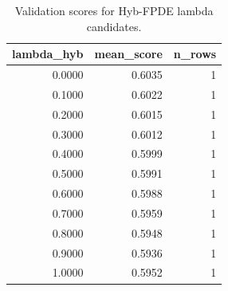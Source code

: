 \begin{table}[t]
\caption{Validation scores for Hyb-FPDE lambda candidates.}
\label{tab:lambda_distribution_computed}
\centering
\begin{tabular}{rrr}
\toprule
lambda\_hyb & mean\_score & n\_rows \\
\midrule
0.0000 & 0.6035 & 1 \\
0.1000 & 0.6022 & 1 \\
0.2000 & 0.6015 & 1 \\
0.3000 & 0.6012 & 1 \\
0.4000 & 0.5999 & 1 \\
0.5000 & 0.5991 & 1 \\
0.6000 & 0.5988 & 1 \\
0.7000 & 0.5959 & 1 \\
0.8000 & 0.5948 & 1 \\
0.9000 & 0.5936 & 1 \\
1.0000 & 0.5952 & 1 \\
\bottomrule
\end{tabular}

\end{table}

